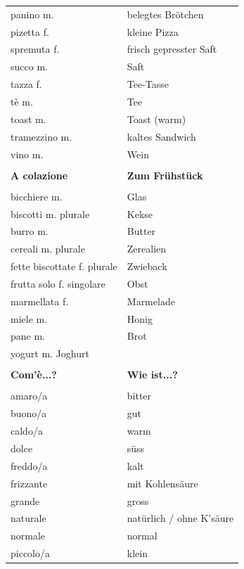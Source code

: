 \documentclass[10pt]{scrartcl}
\begin{document}
\begin{multicols*}{2}
\begin{supertabular}{p{4cm}p{4cm}}
panino \hfill m. & belegtes Brötchen\\
pizetta \hfill f. & kleine Pizza\\
spremuta \hfill f. & frisch gepresster Saft\\
succo \hfill m. & Saft\\
tazza \hfill f. & Tee-Tasse\\
tè \hfill m. & Tee\\
toast \hfill m. & Toast (warm)\\
tramezzino \hfill m. & kaltes Sandwich\\
vino \hfill m. & Wein\\
\\
\textbf{A colazione} & \textbf{Zum Frühstück}\\
\\
bicchiere \hfill m. & Glas\\
biscotti \hfill m. plurale & Kekse\\
burro \hfill m. & Butter\\
cereali \hfill m. plurale & Zerealien\\
fette biscottate \hfill f. plurale & Zwieback\\
frutta \hfill solo f. singolare & Obst\\
marmellata \hfill f. & Marmelade\\
miele \hfill m. & Honig\\
pane \hfill m. & Brot\\
yogurt \hfill m. Joghurt\\
\\
\textbf{Com'è...?} & \textbf{Wie ist...?}\\
\\
amaro/a & bitter\\
buono/a & gut\\
caldo/a & warm\\
dolce & süss\\
freddo/a & kalt\\
frizzante & mit Kohlensäure\\
grande & gross\\
naturale & natürlich / ohne K'säure\\
normale & normal\\
piccolo/a & klein\\
\end{supertabular}

\end{multicols*}
\end{document}
